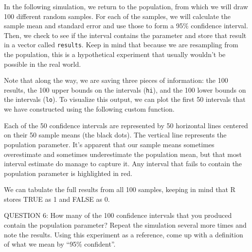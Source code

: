 \documentclass[11pt]{article}
\begin{document}
In the following simulation, we return to the population, from which we will draw 100 different random samples.  For each of the samples, we will calculate the sample mean and standard error and use those to form a 95\% confidence interval.  Then, we check to see if the interval contains the parameter and store that result in a vector called \texttt{results}.  Keep in mind that because we are resampling from the population, this is a hypothetical experiment that usually wouldn't be possible in the real world.



Note that along the way, we are saving three pieces of information: the 100 results, the 100 upper bounds on the intervals (\texttt{hi}), and the 100 lower bounds on the intervals (\texttt{lo}).  To visualize this output, we can plot the first 50 intervals that we have constructed using the following custom function.


Each of the 50 confidence intervals are represented by 50 horizontal lines centered on their 50 sample means (the black dots).  The vertical line represents the population parameter.  It's apparent that our sample means sometimes overestimate and sometimes underestimate the population mean, but that most interval estimate do manage to capture it.  Any interval that fails to contain the population parameter is highlighted in red.

We can tabulate the full results from all 100 samples, keeping in mind that R stores TRUE as 1 and FALSE as 0.


\noindent QUESTION 6: How many of the 100 confidence intervals that you produced contain the population parameter?  Repeat the simulation several more times and note the results.  Using this experiment as a reference, come up with a definition of what we mean by ``95\% confident''.
\bigskip
\end{document}
